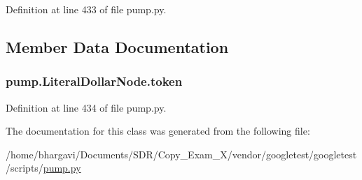 Definition at line 433 of file pump.\+py.



\subsection{Member Data Documentation}
\subsubsection[{\texorpdfstring{token}{token}}]{\setlength{\rightskip}{0pt plus 5cm}pump.\+Literal\+Dollar\+Node.\+token}\hypertarget{classpump_1_1_literal_dollar_node_ab4c6e209635b8868bcdf0fe8053431c6}{}\label{classpump_1_1_literal_dollar_node_ab4c6e209635b8868bcdf0fe8053431c6}


Definition at line 434 of file pump.\+py.



The documentation for this class was generated from the following file\+:\begin{DoxyCompactItemize}
\item 
/home/bhargavi/\+Documents/\+S\+D\+R/\+Copy\+\_\+\+Exam\+\_\+X/vendor/googletest/googletest/scripts/\hyperlink{pump_8py}{pump.\+py}\end{DoxyCompactItemize}
